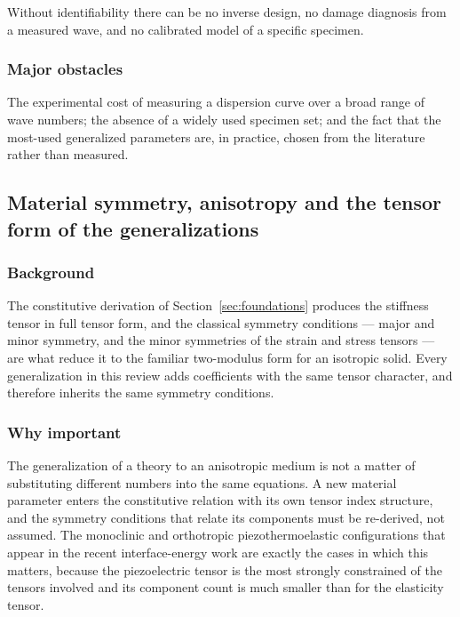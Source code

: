 Without identifiability there can be no inverse design, no damage diagnosis from a measured wave, and no calibrated model of a specific specimen.

\subsubsection{Major obstacles}

The experimental cost of measuring a dispersion curve over a broad range of wave numbers; the absence of a widely used specimen set; and the fact that the most-used generalized parameters are, in practice, chosen from the literature rather than measured.

\subsection{Material symmetry, anisotropy and the tensor form of the generalizations}
\label{sec:15.9}

\subsubsection{Background}

The constitutive derivation of Section~\ref{sec:foundations} produces the stiffness tensor in full tensor form, and the classical symmetry conditions --- major and minor symmetry, and the minor symmetries of the strain and stress tensors --- are what reduce it to the familiar two-modulus form for an isotropic solid. Every generalization in this review adds coefficients with the same tensor character, and therefore inherits the same symmetry conditions.

\subsubsection{Why important}

The generalization of a theory to an anisotropic medium is not a matter of substituting different numbers into the same equations. A new material parameter enters the constitutive relation with its own tensor index structure, and the symmetry conditions that relate its components must be re-derived, not assumed. The monoclinic and orthotropic piezothermoelastic configurations that appear in the recent interface-energy work \cite{Barak2023JTS} are exactly the cases in which this matters, because the piezoelectric tensor is the most strongly constrained of the tensors involved and its component count is much smaller than for the elasticity tensor.

